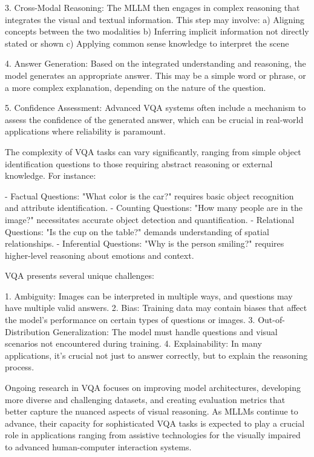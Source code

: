 3. Cross-Modal Reasoning: The MLLM then engages in complex reasoning that integrates the visual and textual information. This step may involve:
   a) Aligning concepts between the two modalities
   b) Inferring implicit information not directly stated or shown
   c) Applying common sense knowledge to interpret the scene

4. Answer Generation: Based on the integrated understanding and reasoning, the model generates an appropriate answer. This may be a simple word or phrase, or a more complex explanation, depending on the nature of the question.

5. Confidence Assessment: Advanced VQA systems often include a mechanism to assess the confidence of the generated answer, which can be crucial in real-world applications where reliability is paramount.

The complexity of VQA tasks can vary significantly, ranging from simple object identification questions to those requiring abstract reasoning or external knowledge. For instance:

- Factual Questions: "What color is the car?" requires basic object recognition and attribute identification.
- Counting Questions: "How many people are in the image?" necessitates accurate object detection and quantification.
- Relational Questions: "Is the cup on the table?" demands understanding of spatial relationships.
- Inferential Questions: "Why is the person smiling?" requires higher-level reasoning about emotions and context.

VQA presents several unique challenges:

1. Ambiguity: Images can be interpreted in multiple ways, and questions may have multiple valid answers.
2. Bias: Training data may contain biases that affect the model's performance on certain types of questions or images.
3. Out-of-Distribution Generalization: The model must handle questions and visual scenarios not encountered during training.
4. Explainability: In many applications, it's crucial not just to answer correctly, but to explain the reasoning process.

Ongoing research in VQA focuses on improving model architectures, developing more diverse and challenging datasets, and creating evaluation metrics that better capture the nuanced aspects of visual reasoning. As MLLMs continue to advance, their capacity for sophisticated VQA tasks is expected to play a crucial role in applications ranging from assistive technologies for the visually impaired to advanced human-computer interaction systems.



